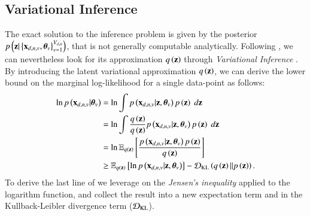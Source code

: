 \subsection{Variational Inference}
\label{ssec:derivation}

The exact solution to the inference problem is given by the posterior $\p{\z|\set{\xdnv,\thetab_v}_{v=1}^{V_{d,n}}}$, that is not generally computable analytically.
Following \cite{Antelmi2019}, we can nevertheless look for its approximation $\qz$ through \textit{Variational Inference} \citep{Blei2017}.
By introducing the latent variational approximation $\qz$, we can derive the lower bound on the marginal log-likelihood for a single data-point as follows:
\begin{equation}\label{eq:LB}
\begin{aligned}
\ln \p{\xdnv|\thetab_v} &= \ln \int \p{\xdnv|\z, \thetab_v} \p{\z} \; d\z \\
                        &= \ln \int \frac{\qz}{\qz} \p{\xdnv|\z, \thetab_v} \p{\z} \; d\z \\
                        &= \ln \EE{\qz}{\frac{\p{\xdnv|\z, \thetab_v} \p{\z}}{\qz}} \\
                        &\geq \EE{\qz}{\ln \p{\xdnv|\z, \thetab_v}} - \KL{\qz}{\pz}.
\end{aligned}
\end{equation}
To derive the last line of  we leverage on the \textit{Jensen's inequality} applied to the logarithm function, and collect the result into a new expectation term and in the Kullback-Leibler divergence term ($\kl$).

